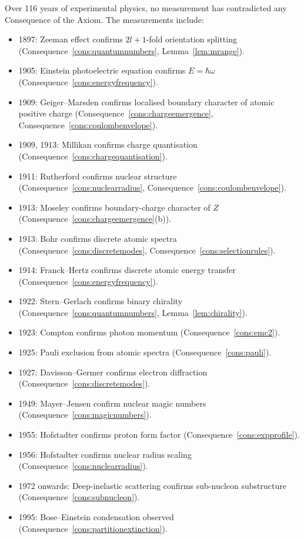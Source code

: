 \documentclass[11pt,twocolumn,a4paper]{article}
\theoremstyle{axiomstyle}
\theoremstyle{conseqstyle}
\theoremstyle{definition}
\theoremstyle{remark}
\begin{document}
Over 116 years of experimental physics, no measurement has contradicted any Consequence of the Axiom. The measurements include:
\begin{itemize}
\item 1897: Zeeman effect confirms $2l+1$-fold orientation splitting (Consequence~\ref{cons:quantumnumbers}, Lemma~\ref{lem:mrange}).
\item 1905: Einstein photoelectric equation confirms $E=\hbar\omega$ (Consequence~\ref{cons:energyfrequency}).
\item 1909: Geiger--Marsden confirms localised boundary character of atomic positive charge (Consequence~\ref{cons:chargeemergence}, Consequence~\ref{cons:coulombenvelope}).
\item 1909, 1913: Millikan confirms charge quantisation (Consequence~\ref{cons:chargequantisation}).
\item 1911: Rutherford confirms nuclear structure (Consequence~\ref{cons:nuclearradius}, Consequence~\ref{cons:coulombenvelope}).
\item 1913: Moseley confirms boundary-charge character of $Z$ (Consequence~\ref{cons:chargeemergence}(b)).
\item 1913: Bohr confirms discrete atomic spectra (Consequence~\ref{cons:discretemodes}, Consequence~\ref{cons:selectionrules}).
\item 1914: Franck--Hertz confirms discrete atomic energy transfer (Consequence~\ref{cons:energyfrequency}).
\item 1922: Stern--Gerlach confirms binary chirality (Consequence~\ref{cons:quantumnumbers}, Lemma~\ref{lem:chirality}).
\item 1923: Compton confirms photon momentum (Consequence~\ref{cons:emc2}).
\item 1925: Pauli exclusion from atomic spectra (Consequence~\ref{cons:pauli}).
\item 1927: Davisson--Germer confirms electron diffraction (Consequence~\ref{cons:discretemodes}).
\item 1949: Mayer--Jensen confirm nuclear magic numbers (Consequence~\ref{cons:magicnumbers}).
\item 1955: Hofstadter confirms proton form factor (Consequence~\ref{cons:expprofile}).
\item 1956: Hofstadter confirms nuclear radius scaling (Consequence~\ref{cons:nuclearradius}).
\item 1972 onwards: Deep-inelastic scattering confirms sub-nucleon substructure (Consequence~\ref{cons:subnucleon}).
\item 1995: Bose--Einstein condensation observed (Consequence~\ref{cons:partitionextinction}).
\end{itemize}
\end{document}

